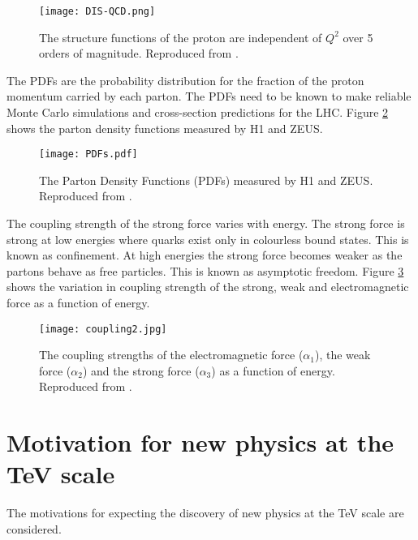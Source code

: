\begin{figure}
\begin{center}
\texttt{[image: DIS-QCD.png]}
\end{center}
\caption{The structure functions of the proton are independent of $Q^{2}$ over 5
orders of magnitude. Reproduced from \cite{h1andzeus}.}
\label{fig:dis}
\end{figure}

The PDFs are the probability distribution for the fraction of the proton 
momentum carried by each parton. The PDFs need to be known to make reliable 
Monte Carlo simulations and cross-section predictions for the LHC. Figure 
\ref{fig:pdfs} shows the parton density functions measured by H1 and ZEUS. \\

\begin{figure}
\begin{center}
\texttt{[image: PDFs.pdf]}
\end{center}
\caption{The Parton Density Functions (PDFs) measured by H1 and ZEUS. Reproduced
from \cite{h1andzeus}.}
\label{fig:pdfs}
\end{figure}

The coupling strength of the strong force varies with energy. The strong force 
is strong at low energies where quarks exist only in colourless bound states. 
This is known as confinement. At high energies the strong force becomes weaker 
as the partons behave as free particles. This is known as asymptotic freedom. 
Figure \ref{fig:coupling} shows the variation in coupling strength of the 
strong, weak and electromagnetic force as a function of energy.

\begin{figure}
\begin{center}
\texttt{[image: coupling2.jpg]}
\end{center}
\caption{The coupling strengths of the electromagnetic force ($\alpha_{1}$), the 
weak force ($\alpha_{2}$) and the strong force ($\alpha_{3}$) as a function of 
energy. Reproduced from \cite{nobel_2004}.}
\label{fig:coupling}
\end{figure}

\section{Motivation for new physics at the TeV scale}

The motivations for expecting the discovery of new physics at the TeV scale are
considered. \\

